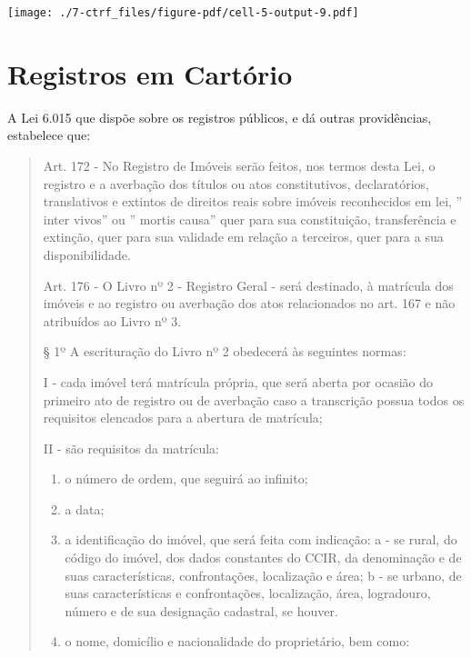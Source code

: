 \documentclass[
  letterpaper,
]{report}
\begin{document}
\texttt{[image: ./7-ctrf\_files/figure-pdf/cell-5-output-9.pdf]}


\hypertarget{registros-em-cartuxf3rio}{%
\chapter{Registros em Cartório}\label{registros-em-cartuxf3rio}}

A Lei 6.015 que dispõe sobre os registros públicos, e dá outras
providências, estabelece que:

\begin{quote}
Art. 172 - No Registro de Imóveis serão feitos, nos termos desta Lei, o
registro e a averbação dos títulos ou atos constitutivos, declaratórios,
translativos e extintos de direitos reais sobre imóveis reconhecidos em
lei, '' inter vivos'' ou '' mortis causa'' quer para sua constituição,
transferência e extinção, quer para sua validade em relação a terceiros,
quer para a sua disponibilidade.

Art. 176 - O Livro nº 2 - Registro Geral - será destinado, à matrícula
dos imóveis e ao registro ou averbação dos atos relacionados no art. 167
e não atribuídos ao Livro nº 3.

§ 1º A escrituração do Livro nº 2 obedecerá às seguintes normas:

I - cada imóvel terá matrícula própria, que será aberta por ocasião do
primeiro ato de registro ou de averbação caso a transcrição possua todos
os requisitos elencados para a abertura de matrícula;

II - são requisitos da matrícula:

\begin{enumerate}
\def\labelenumi{\arabic{enumi})}
\item
  o número de ordem, que seguirá ao infinito;
\item
  a data;
\item
  a identificação do imóvel, que será feita com indicação: a - se rural,
  do código do imóvel, dos dados constantes do CCIR, da denominação e de
  suas características, confrontações, localização e área; b - se
  urbano, de suas características e confrontações, localização, área,
  logradouro, número e de sua designação cadastral, se houver.
\item
  o nome, domicílio e nacionalidade do proprietário, bem como:


\end{enumerate}
\end{quote}
\end{document}
